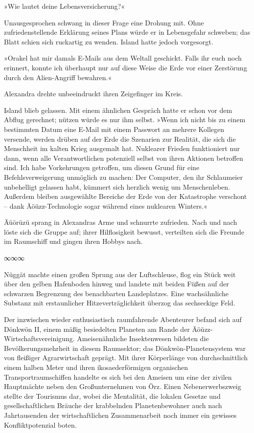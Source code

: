 »Wie lautet deine Lebensversicherung?«

Unausgesprochen schwang in dieser Frage eine Drohung mit. Ohne zufriedenstellende Erklärung seines Plans würde er in Lebensgefahr schweben; das Blatt schien sich ruckartig zu wenden. Island hatte jedoch vorgesorgt.

»Orakel hat mir damals E-Mails aus dem Weltall geschickt. Falls ihr euch noch erinnert, konnte ich überhaupt nur auf diese Weise die Erde vor einer Zerstörung durch den Alien-Angriff bewahren.«

Alexandra drehte unbeeindruckt ihren Zeigefinger im Kreis. 

Island blieb gelassen. Mit einem ähnlichen Gespräch hatte er schon vor dem Abflug gerechnet; nützen würde es nur ihm selbst. »Wenn ich nicht bis zu einem bestimmten Datum eine E-Mail mit einem Passwort an mehrere Kollegen versende, werden drüben auf der Erde die Szenarien zur Realität, die sich die Menschheit im kalten Krieg ausgemalt hat. Nuklearer Frieden funktioniert nur dann, wenn alle Verantwortlichen potenziell selbst von ihren Aktionen betroffen sind. Ich habe Vorkehrungen getroffen, um diesen Grund für eine Befehlsverweigerung unmöglich zu machen: Der Computer, den ihr Schlaumeier unbehelligt gelassen habt, kümmert sich herzlich wenig um Menschenleben. Außerdem bleiben ausgewählte Bereiche der Erde von der Katastrophe verschont – dank Äöüzz-Technologie sogar während eines nuklearen Winters.«

Äüörüzü sprang in Alexandras Arme und schnurrte zufrieden. Nach und nach löste sich die Gruppe auf; ihrer Hilflosigkeit bewusst, verteilten sich die Freunde im Raumschiff und gingen ihren Hobbys nach.

\begin{center}
∞∞∞
\end{center}

Nüggät machte einen großen Sprung aus der Luftschleuse, flog ein Stück weit über den gelben Hafenboden hinweg und landete mit beiden Füßen auf der schwarzen Begrenzung des benachbarten Landeplatzes. Eine wachsähnliche Substanz mit erstaunlicher Hitzeverträglichkeit überzog das sechseckige Feld.

Der inzwischen wieder enthusiastisch raumfahrende Abenteurer befand sich auf Dönkwön II, einem mäßig besiedelten Planeten am Rande der Äöüzz-Wirtschaftsvereinigung. Ameisenähnliche Insektenwesen bildeten die Bevölkerungsmehrheit in diesem Raumsektor; das Dönkwön-Planetensystem war von fleißiger Agrarwirtschaft geprägt. Mit ihrer Körperlänge von durchschnittlich einem halben Meter und ihren ikosaederförmigen organischen Transportraumschiffen handelte es sich bei den Ameisen um eine der zivilen Hauptmächte neben den Großunternehmen von Örz. Einen Nebenerwerbszweig stellte der Tourismus dar, wobei die Mentalität, die lokalen Gesetze und gesellschaftlichen Bräuche der krabbelnden Planetenbewohner auch nach Jahrtausenden der wirtschaftlichen Zusammenarbeit noch immer ein gewisses Konfliktpotenzial boten.


